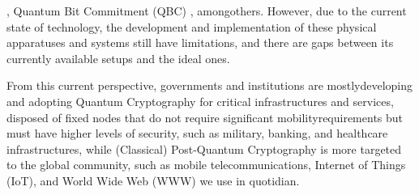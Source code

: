 \documentclass[runningheads]{llncs}
\numberwithin{equation}{section}
\begin{document}
\cite{li-et-al:discrete-time-interacting-quantum-walks-and-quantum-hash-schemes:2013:06-2024,yang-et-al:quantum-hash-function-application-privacy-amplification-quantum-key-distribution-pseudo-random-number-generation-and-image-encryption:2016:06-2024}, Quantum Bit Commitment (QBC) \cite{brassard-crepeau:quantum-bit-commitment-and-coin-tossing-protocols:1991:06-2024,mayers:unconditionally-secure-quantum-bit-commitment-impossible:1997:06-2024,lo-chau:why-quantum-bit-commitment-and-ideal-quantum-coin-tossing-are-impossible:1998:06-2024}, among\break others. However, due to the current state of technology, the development and implementation of these physical apparatuses and systems still have limitations, and there are gaps between its currently available setups and the ideal ones.

    From this current perspective, governments and institutions are mostly\break developing and adopting Quantum Cryptography for critical infrastructures and services, disposed of fixed nodes that do not require significant mobility\break requirements but must have higher levels of security, such as military, banking, and healthcare infrastructures, while (Classical) Post-Quantum Cryptography is more targeted to the global community, such as mobile telecommunications, Internet of Things (IoT), and World Wide Web (WWW) we use in quotidian.
\end{document}
